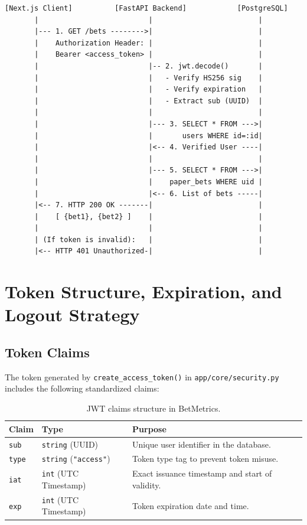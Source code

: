 \documentclass[11pt,a4paper]{article}
\begin{document}
\begin{lstlisting}
[Next.js Client]          [FastAPI Backend]            [PostgreSQL]
       |                          |                         |
       |--- 1. GET /bets -------->|                         |
       |    Authorization Header: |                         |
       |    Bearer <access_token> |                         |
       |                          |-- 2. jwt.decode()       |
       |                          |   - Verify HS256 sig    |
       |                          |   - Verify expiration   |
       |                          |   - Extract sub (UUID)  |
       |                          |                         |
       |                          |--- 3. SELECT * FROM --->|
       |                          |       users WHERE id=:id|
       |                          |<-- 4. Verified User ----|
       |                          |                         |
       |                          |--- 5. SELECT * FROM --->|
       |                          |    paper_bets WHERE uid |
       |                          |<-- 6. List of bets -----|
       |<-- 7. HTTP 200 OK -------|                         |
       |    [ {bet1}, {bet2} ]    |                         |
       |                          |                         |
       | (If token is invalid):   |                         |
       |<-- HTTP 401 Unauthorized-|                         |
\end{lstlisting}

\section{Token Structure, Expiration, and Logout Strategy}

\subsection{Token Claims}
The token generated by \texttt{create\_access\_token()} in \texttt{app/core/security.py} includes the following standardized claims:

\begin{table}[h!]
\centering
\small
\begin{tabular}{lll}
\toprule
\textbf{Claim} & \textbf{Type} & \textbf{Purpose} \\
\midrule
\texttt{sub}  & \texttt{string} (UUID) & Unique user identifier in the database. \\
\texttt{type} & \texttt{string} (\texttt{"access"}) & Token type tag to prevent token misuse. \\
\texttt{iat}  & \texttt{int} (UTC Timestamp) & Exact issuance timestamp and start of validity. \\
\texttt{exp}  & \texttt{int} (UTC Timestamp) & Token expiration date and time. \\
\bottomrule
\end{tabular}
\caption{JWT claims structure in BetMetrics.}
\end{table}
\end{document}
